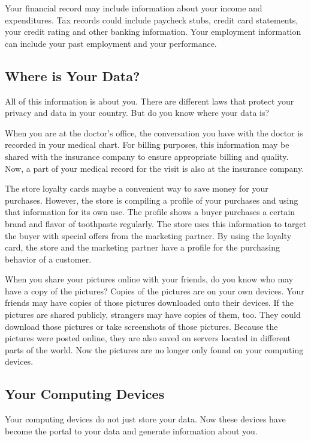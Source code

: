 \documentclass{article}
\begin{document}
Your financial record may include information about your income and expenditures. Tax records could include paycheck stubs, credit card statements, your credit rating and other banking information. Your employment information can include your past employment and your performance.

\subsection{Where is Your Data?
}

All of this information is about you. There are different laws that protect your privacy and data in your country. But do you know where your data is?

When you are at the doctor’s office, the conversation you have with the doctor is recorded in your medical chart. For billing purposes, this information may be shared with the insurance company to ensure appropriate billing and quality. Now, a part of your medical record for the visit is also at the insurance company.

The store loyalty cards maybe a convenient way to save money for your purchases. However, the store is compiling a profile of your purchases and using that information for its own use. The profile shows a buyer purchases a certain brand and flavor of toothpaste regularly. The store uses this information to target the buyer with special offers from the marketing partner. By using the loyalty card, the store and the marketing partner have a profile for the purchasing behavior of a customer.

When you share your pictures online with your friends, do you know who may have a copy of the pictures? Copies of the pictures are on your own devices. Your friends may have copies of those pictures downloaded onto their devices. If the pictures are shared publicly, strangers may have copies of them, too. They could download those pictures or take screenshots of those pictures. Because the pictures were posted online, they are also saved on servers located in different parts of the world. Now the pictures are no longer only found on your computing devices.

\subsection{Your Computing Devices}

Your computing devices do not just store your data. Now these devices have become the portal to your data and generate information about you.
\end{document}
